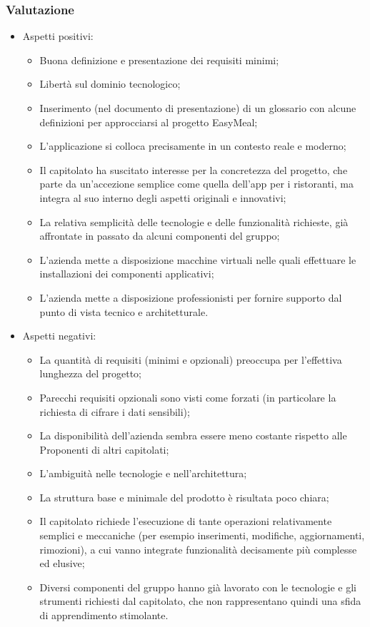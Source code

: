 \subsubsection{Valutazione}
\begin{itemize}
  \item Aspetti positivi:
  \begin{itemize}
    \item Buona definizione e presentazione dei requisiti minimi;
    \item Libertà sul dominio tecnologico;
    \item Inserimento (nel documento di presentazione) di un glossario con alcune definizioni per approcciarsi al progetto EasyMeal;
    \item L'applicazione si colloca precisamente in un contesto reale e moderno;
    \item Il capitolato ha suscitato interesse per la concretezza del progetto, che parte da un’accezione semplice come quella dell’app per i ristoranti, ma integra al suo interno degli aspetti originali e innovativi;
    \item La relativa semplicità delle tecnologie e delle funzionalità richieste, già affrontate in passato da alcuni componenti del gruppo;
    \item L'azienda mette a disposizione macchine virtuali nelle quali effettuare le installazioni dei componenti applicativi;
    \item L’azienda mette a disposizione professionisti per fornire supporto dal punto di vista tecnico e architetturale.
  \end{itemize}
  \item Aspetti negativi:
  \begin{itemize}
    \item La quantità di requisiti (minimi e opzionali) preoccupa per l’effettiva lunghezza del progetto;
    \item Parecchi requisiti opzionali sono visti come forzati (in particolare la richiesta di cifrare i dati sensibili);
    \item La disponibilità dell’azienda sembra essere meno costante rispetto alle Proponenti di altri capitolati;
    \item L’ambiguità nelle tecnologie e nell’architettura;
    \item La struttura base e minimale del prodotto è risultata poco chiara;
    \item Il capitolato richiede l'esecuzione di tante operazioni relativamente semplici e meccaniche (per esempio inserimenti, modifiche, aggiornamenti, rimozioni), a cui vanno integrate funzionalità decisamente più complesse ed elusive;
    \item Diversi componenti del gruppo hanno già lavorato con le tecnologie e gli strumenti richiesti dal capitolato, che non rappresentano quindi una sfida di apprendimento stimolante.
  \end{itemize}
\end{itemize}


